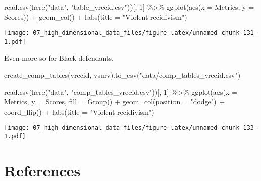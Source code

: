 \documentclass[
]{book}
\newenvironment{Shaded}{\begin{snugshade}}{\end{snugshade}}
\newcommand{\AttributeTok}[1]{\textcolor[rgb]{0.77,0.63,0.00}{#1}}
\newcommand{\DecValTok}[1]{\textcolor[rgb]{0.00,0.00,0.81}{#1}}
\newcommand{\FunctionTok}[1]{\textcolor[rgb]{0.00,0.00,0.00}{#1}}
\newcommand{\NormalTok}[1]{#1}
\newcommand{\SpecialCharTok}[1]{\textcolor[rgb]{0.00,0.00,0.00}{#1}}
\newcommand{\StringTok}[1]{\textcolor[rgb]{0.31,0.60,0.02}{#1}}
\begin{document}
\begin{Shaded}
\begin{Highlighting}[]
\FunctionTok{read.csv}\NormalTok{(}\FunctionTok{here}\NormalTok{(}\StringTok{"data"}\NormalTok{, }\StringTok{"table\_vrecid.csv"}\NormalTok{))[,}\SpecialCharTok{{-}}\DecValTok{1}\NormalTok{] }\SpecialCharTok{\%\textgreater{}\%}
  \FunctionTok{ggplot}\NormalTok{(}\FunctionTok{aes}\NormalTok{(}\AttributeTok{x =}\NormalTok{ Metrics, }\AttributeTok{y =}\NormalTok{ Scores)) }\SpecialCharTok{+}
  \FunctionTok{geom\_col}\NormalTok{() }\SpecialCharTok{+}
  \FunctionTok{labs}\NormalTok{(}\AttributeTok{title =} \StringTok{"Violent recidivism"}\NormalTok{)}
\end{Highlighting}
\end{Shaded}

\texttt{[image: 07\_high\_dimensional\_data\_files/figure-latex/unnamed-chunk-131-1.pdf]}

Even more so for Black defendants.

\begin{Shaded}
\begin{Highlighting}[]

\NormalTok{create\_comp\_tables(vrecid, vsurv).to\_csv(}\StringTok{"data/comp\_tables\_vrecid.csv"}\NormalTok{)}
\end{Highlighting}
\end{Shaded}

\begin{Shaded}
\begin{Highlighting}[]
\FunctionTok{read.csv}\NormalTok{(}\FunctionTok{here}\NormalTok{(}\StringTok{"data"}\NormalTok{, }\StringTok{"comp\_tables\_vrecid.csv"}\NormalTok{))[,}\SpecialCharTok{{-}}\DecValTok{1}\NormalTok{] }\SpecialCharTok{\%\textgreater{}\%}
  \FunctionTok{ggplot}\NormalTok{(}\FunctionTok{aes}\NormalTok{(}\AttributeTok{x =}\NormalTok{ Metrics, }\AttributeTok{y =}\NormalTok{ Scores, }\AttributeTok{fill =}\NormalTok{ Group)) }\SpecialCharTok{+}
  \FunctionTok{geom\_col}\NormalTok{(}\AttributeTok{position =} \StringTok{"dodge"}\NormalTok{) }\SpecialCharTok{+}
  \FunctionTok{coord\_flip}\NormalTok{() }\SpecialCharTok{+}
  \FunctionTok{labs}\NormalTok{(}\AttributeTok{title =} \StringTok{"Violent recidivism"}\NormalTok{)}
\end{Highlighting}
\end{Shaded}

\texttt{[image: 07\_high\_dimensional\_data\_files/figure-latex/unnamed-chunk-133-1.pdf]}

\hypertarget{references-5}{%
\section{References}\label{references-5}}
\end{document}
